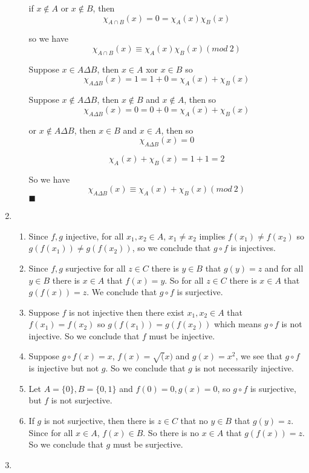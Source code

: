 \documentclass[11pt]{article}
\begin{document}
\begin{enumerate}
\begin{enumerate}
			if $x \notin A$ or $x \notin B$, then
			\[\chi_{A \cap B}(x) = 0 = \chi_{A}(x)\chi_{B}(x)\]
			
			so we have \[\chi_{A \cap B}(x) \equiv \chi_{A}(x)\chi_{B}(x) (mod\ 2)\]
			
			Suppose $x \in A \Delta B$, then $x \in A$ xor $x \in B$ so
			\[\chi_{A \Delta B}(x) = 1 = 1 + 0 = \chi_{A}(x) + \chi_{B}(x)\]
			
			Suppose $x \notin A \Delta B$, then $x \notin B$ and $x \notin A$, then so
			\[\chi_{A \Delta B}(x) = 0 = 0 + 0 = \chi_{A}(x) + \chi_{B}(x)\]
			
			or $x \notin A \Delta B$, then $x \in B$ and $x \in A$, then so
			\[\chi_{A \Delta B}(x) = 0\]
			
			\[\chi_{A}(x) + \chi_{B}(x) = 1 + 1 = 2\]
			 
			 So we have \[\chi_{A \Delta B}(x) \equiv \chi_{A}(x) + \chi_{B}(x) (mod\ 2)\]
			 $\blacksquare$
		\end{enumerate}
		\item 
		\begin{enumerate}[(1).]
			\item Since $f, g$ injective, for all $x_1, x_2 \in A$, $x_1 \neq x_2$ implies $f(x_1) \neq f(x_2)$ so $g(f(x_1)) \neq g(f(x_2))$, so we conclude that $g \circ f$ is injectives.
			\item Since $f, g$ surjective for all $z \in C$ there is $y \in B$ that $g(y) = z$ and for all $y \in B$ there is $x \in A$ that $f(x) = y$. So for all $z \in C$ there is $x \in A$ that $g(f(x)) = z$. We conclude that $g \circ f$ is surjective.
			\item Suppose $f$ is not injective then there exist $x_1, x_2 \in A$ that $f(x_1) = f(x_2)$ so $g(f(x_1)) = g(f(x_2))$ which means $g \circ f$ is not injective. So we conclude that $f$ must be injective.
			\item Suppose $g \circ f(x) = x$, $f(x) = \sqrt (x)$ and $g(x) = x^2$, we see that $g \circ f$ is injective but not $g$. So we conclude that $g$ is not necessarily injective.
			\item Let $A = \{0\}, B = \{0, 1\}$ and $f(0) = 0, g(x) = 0$, so $g \circ f$ is surjective, but $f$ is not surjective.
			\item If $g$ is not surjective, then there is $z \in C$ that no $y \in B$ that $g(y) = z$. Since for all $x \in A$, $f(x) \in B$. So there is no $x \in A$ that $g(f(x)) = z$. So we conclude that $g$ must be surjective.
		\end{enumerate}
		\item 

\end{enumerate}
\end{document}
